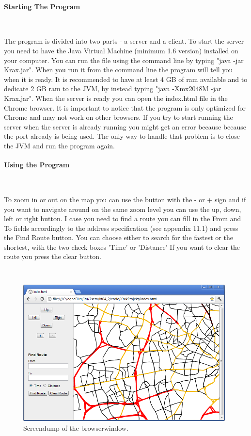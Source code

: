 \documentclass[a4paper,10pt,titlepage]{article}
\begin{document}
		\paragraph{Starting The Program}\mbox{}\
	
		The program is divided into two parts - a server and a client. To start the server you need to have the Java Virtual Machine (minimum 1.6 version) installed on your computer. You can run the file using the command line by typing "java -jar Krax.jar". When you run it from the command line the program will tell you when it is ready. It is recommended to have at least 4 GB of ram available and to dedicate 2 GB ram to the JVM, by instead typing "java -Xmx2048M -jar Krax.jar". When the server is ready you can open the index.html file in the Chrome browser. It is important to notice that the program is only optimized for Chrome and may not work on other browsers. If you try to start running the server when the server is already running you might get an error because because the port already is being used. The only way to handle that problem is to close the JVM and run the program again.  
		\paragraph{Using the Program}\mbox{}\
		
		To zoom in or out on the map you can use the button with the - or + sign and if you want to navigate around on the same zoom level you can use the up, down, left or right button. I case you need to find a route you can fill in the From and To fields accordingly to the address specification (see appendix 11.1) and press the Find Route button. You can choose either to search for the fastest or the shortest, with the two check boxes 'Time' or 'Distance' If you want to clear the route you press the clear button.

		 \mbox{}\\
		
		\begin{figure}[H]
\includegraphics[width=110mm]{screendump.png}
\caption{Screendump of the browserwindow.}
\label{fig:screendump}
\end{figure}
		
\end{document}
